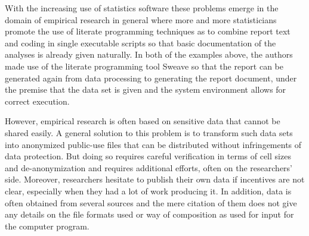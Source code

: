 \documentclass{acm_proc_article-sp}
\begin{document}
With the increasing use of statistics software \cite{RePEc_hum_wpaper_sfb649dp2011_020}
these problems emerge in the domain of empirical research in general where more and more statisticians promote the use of literate programming techniques  
\cite{leisch2011executable}
\cite{rossini2003literate}
as to combine report text and coding in single executable scripts so that basic documentation of the analyses is already given naturally.
In both of the examples above, the authors made use of the literate programming tool Sweave \cite{lmucs_papers_Leisch_2002} 
so that the report can be generated again from data processing to generating the report document, under the premise that the data set is given and the system environment allows for correct execution.


However, empirical research is often based on sensitive data that cannot be shared easily.
A general solution to this problem is to transform such data sets into anonymized public-use files that can be distributed without infringements of data protection.
But doing so requires careful verification in terms of cell sizes and de-anonymization and requires additional efforts, often on the researchers' side.
Moreover, researchers hesitate to publish their own data if incentives are not clear, especially when they had a lot of work producing it.
In addition, data is often obtained from several sources and the mere citation of them does not give any details on the file formats used or way of composition as used for input for the computer program.
\end{document}
